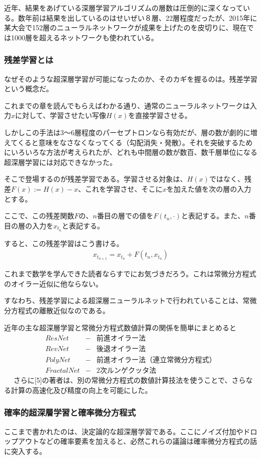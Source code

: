 \documentclass[dvipdfmx, a4paper]{jsarticle}
\begin{document}
近年、結果をあげている深層学習アルゴリズムの層数は圧倒的に深くなっている。数年前は結果を出しているのはせいぜい８層、22層程度だったが、2015年に某大会で152層のニューラルネットワークが成果を上げたのを皮切りに、現在では1000層を超えるネットワークも使われている。

\subsubsection{残差学習とは}
なぜそのような超深層学習が可能になったのか、そのカギを握るのは。残差学習という概念だ。

これまでの章を読んでもらえばわかる通り、通常のニューラルネットワークは入力$x$に対して、学習させたい写像$H(x)$を直接学習させる。

しかしこの手法は3～6層程度のパーセプトロンなら有効だが、層の数が劇的に増えてくると意味をなさなくなってくる（勾配消失・発散）。それを突破するためにいろいろな方法が考えられたが、どれも中間層の数が数百、数千層単位になる超深層学習には対応できなかった。

そこで登場するのが残差学習である。学習させる対象は、$H(x)$ではなく、残差$F(x):=H(x)-x$、これを学習させ、そこに$x$を加えた値を次の層の入力とする。

ここで、この残差関数$F$の、$n$番目の層での値を$F(t_n,\cdot)$と表記する。また、$n$番目の層の入力を$x_{t_n}$と表記する。

すると、この残差学習はこう書ける。
\begin{align}
x_{t_{n+1}}=x_{t_n}+F(t_n,x_{t_n})
\end{align}

これまで数学を学んできた読者ならすでにお気づきだろう。これは常微分方程式のオイラー近似に他ならない。

すなわち、残差学習による超深層ニューラルネットで行われていることは、常微分方程式の離散近似なのである。

近年の主な超深層学習と常微分方程式数値計算の関係を簡単にまとめると
\begin{align}
ResNet &-& 前進オイラー法\\
RevNet &-& 後退オイラー法\\
PolyNet &-& 前進オイラー法（連立常微分方程式）\\
FractalNet &-& 2次ルンゲクッタ法
\end{align}　
さらに[5]の著者は、別の常微分方程式の数値計算技法を使うことで、さらなる計算の高速化及び精度の向上を可能にした。

\subsubsection{確率的超深層学習と確率微分方程式}
ここまで書かれたのは、決定論的な超深層学習である。ここにノイズ付加やドロップアウトなどの確率要素を加えると、必然これらの議論は確率微分方程式の話に突入する。
\end{document}
